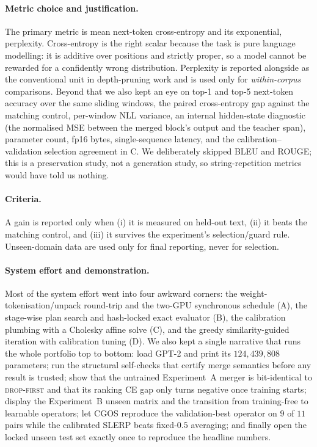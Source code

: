 \documentclass[10pt,a4paper]{article}
\newcommand{\dropfirst}{\textsc{drop-first}}
\begin{document}
\paragraph{Metric choice and justification.} The primary metric is mean
next-token cross-entropy and its exponential, perplexity. Cross-entropy is the
right scalar because the task is pure language modelling: it is additive over
positions and strictly proper, so a model cannot be rewarded for a confidently
wrong distribution. Perplexity is reported alongside as the conventional unit in
depth-pruning work and is used only for \emph{within-corpus} comparisons.
Beyond that we also kept an eye on top-1 and top-5 next-token accuracy over the
same sliding windows, the paired cross-entropy gap against the matching
control, per-window NLL variance, an internal hidden-state diagnostic (the
normalised MSE between the merged block's output and the teacher span),
parameter count, fp16 bytes, single-sequence latency, and the
calibration--validation selection agreement in C. We deliberately skipped BLEU
and ROUGE; this is a preservation study, not a generation study, so
string-repetition metrics would have told us nothing.

\paragraph{Criteria.} A gain is reported only when (i) it is measured on
held-out text, (ii) it beats the matching control, and (iii) it survives the
experiment's selection/guard rule. Unseen-domain data are used only for final
reporting, never for selection.

\paragraph{System effort and demonstration.} Most of the system effort went into
four awkward corners: the weight-tokenisation/unpack round-trip and the
two-GPU synchronous schedule (A), the stage-wise plan search and hash-locked
exact evaluator (B), the calibration plumbing with a Cholesky affine solve (C),
and the greedy similarity-guided iteration with calibration tuning (D). We also
kept a single narrative that runs the whole portfolio top to bottom: load GPT-2
and print its $124{,}439{,}808$ parameters; run the structural self-checks that
certify merge semantics before any result is trusted; show that the untrained
Experiment~A merger is bit-identical to \dropfirst{} and that its ranking CE
gap only turns negative once training starts; display the Experiment~B unseen
matrix and the transition from training-free to learnable operators; let CGOS
reproduce the validation-best operator on $9$ of $11$ pairs while the
calibrated SLERP beats fixed-$0.5$ averaging; and finally open the locked
unseen test set exactly once to reproduce the headline numbers.
\end{document}

